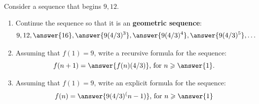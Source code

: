 \documentclass[nooutcomes]{ximera}
\begin{document}
\begin{problem}
Consider a sequence that begins $9, 12$.    
\begin{enumerate}
\item Continue the sequence so that it is an \textbf{geometric sequence}:
\[
9, 12, \answer{16}, \answer{9(4/3)^3}, \answer{9(4/3)^4}, \answer{9(4/3)^5}, \dots
\]
\item Assuming that $f(1)=9$, write a recursive formula for the sequence:
\[
f(n+1)=\answer{f(n)(4/3)}\textrm{, for }n\ge\answer{1}.
\]
\item Assuming that $f(1)=9$, write an explicit formula for the sequence: 
\[
f(n)=\answer{9(4/3)^(n-1)}\textrm{, for }n\ge\answer{1}
\]
\end{enumerate}
\end{problem}
\end{document}
